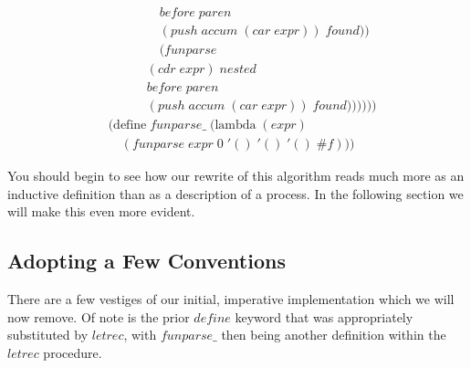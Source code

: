 \begin{figure}[ht]
\begin{align*}
\\& \qquad \qquad before \; paren \; 
\\& \qquad \qquad (push \; accum \; (car \; expr)) \; found))
\\& \qquad \qquad (funparse \; 
\\& \qquad \quad (cdr \; expr) \; nested \; 
\\& \qquad \quad before \; paren \; 
\\& \qquad \quad (push \; accum \; (car \; expr)) \; found))))))
\\& (\text{define} \; funparse\_ \; (\text{lambda} \; (expr)
\\& \quad (funparse \; expr \; 0 \; '() \; '() \; '() \; \#f))) \; 
\end{align*}
\end{figure}

You should begin to see how our rewrite of this algorithm reads much more as an inductive 
definition than as a description of a process. In the following section we will make this 
even more evident.

\subsection{Adopting a Few Conventions}
There are a few vestiges of our initial, imperative implementation which we will now remove. 
Of note is the prior $define$ keyword that was appropriately substituted by $letrec$, with 
$funparse\_$ then being another definition within the $letrec$ procedure.


